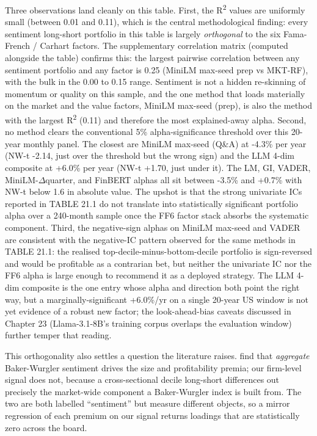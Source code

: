 \bigskip

Three observations land cleanly on this table. First, the R\textsuperscript{2} values are uniformly small (between 0.01 and 0.11), which is the central methodological finding: every sentiment long-short portfolio in this table is largely \textit{orthogonal} to the six Fama-French / Carhart factors. The supplementary correlation matrix (computed alongside the table) confirms this: the largest pairwise correlation between any sentiment portfolio and any factor is 0.25 (MiniLM max-seed prep vs MKT-RF), with the bulk in the 0.00 to 0.15 range. Sentiment is not a hidden re-skinning of momentum or quality on this sample, and the one method that loads materially on the market and the value factors, MiniLM max-seed (prep), is also the method with the largest R\textsuperscript{2} (0.11) and therefore the most explained-away alpha. Second, no method clears the conventional 5\% alpha-significance threshold over this 20-year monthly panel. The closest are MiniLM max-seed (Q\&A) at -4.3\% per year (NW-t -2.14, just over the threshold but the wrong sign) and the LLM 4-dim composite at +6.0\% per year (NW-t +1.70, just under it). The LM, GI, VADER, MiniLM-$\Delta$quarter, and FinBERT alphas all sit between -3.5\% and +0.7\% with NW-t below 1.6 in absolute value. The upshot is that the strong univariate ICs reported in TABLE 21.1 do not translate into statistically significant portfolio alpha over a 240-month sample once the FF6 factor stack absorbs the systematic component. Third, the negative-sign alphas on MiniLM max-seed and VADER are consistent with the negative-IC pattern observed for the same methods in TABLE 21.1: the realised top-decile-minus-bottom-decile portfolio is sign-reversed and would be profitable as a contrarian bet, but neither the univariate IC nor the FF6 alpha is large enough to recommend it as a deployed strategy. The LLM 4-dim composite is the one entry whose alpha and direction both point the right way, but a marginally-significant +6.0\%/yr on a single 20-year US window is not yet evidence of a robust new factor; the look-ahead-bias caveats discussed in Chapter 23 (Llama-3.1-8B's training corpus overlaps the evaluation window) further temper that reading.

This orthogonality also settles a question the literature raises. \cite{habibah2021investor} find that \textit{aggregate} Baker-Wurgler sentiment drives the size and profitability premia; our firm-level signal does not, because a cross-sectional decile long-short differences out precisely the market-wide component a Baker-Wurgler index is built from. The two are both labelled ``sentiment'' but measure different objects, so a mirror regression of each premium on our signal returns loadings that are statistically zero across the board.

